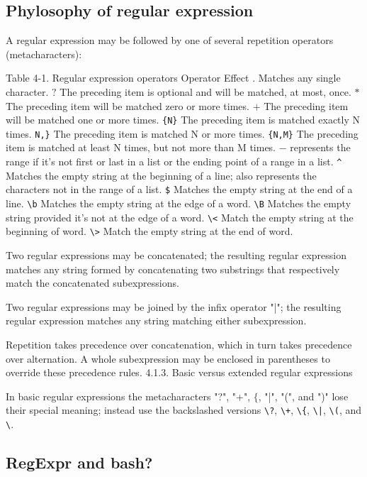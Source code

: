 \subsection{Phylosophy of regular expression}

A regular expression may be followed by one of several repetition operators (metacharacters):

Table 4-1. Regular expression operators
Operator	Effect
$.$	Matches any single character.
$?$	The preceding item is optional and will be matched, at most, once.
$*$	The preceding item will be matched zero or more times.
$+$	The preceding item will be matched one or more times.
\verb={N}=	The preceding item is matched exactly N times.
\verb=N,}=	The preceding item is matched N or more times.
\verb={N,M}=	The preceding item is matched at least N times, but not more than M times.
$-$	represents the range if it's not first or last in a list or the ending point of a range in a list.
\verb=^=	Matches the empty string at the beginning of a line; also represents the characters not in the range of a list.
\verb=$=	Matches the empty string at the end of a line.
\verb=\b=	Matches the empty string at the edge of a word.
\verb=\B=	Matches the empty string provided it's not at the edge of a word.
\verb=\<=	Match the empty string at the beginning of word.
\verb=\>=	Match the empty string at the end of word.

Two regular expressions may be concatenated; the resulting regular expression matches any string formed by concatenating two substrings that respectively match the concatenated subexpressions.

Two regular expressions may be joined by the infix operator "|"; the resulting regular expression matches any string matching either subexpression.

Repetition takes precedence over concatenation, which in turn takes precedence over alternation. A whole subexpression may be enclosed in parentheses to override these precedence rules.
4.1.3. Basic versus extended regular expressions

In basic regular expressions the metacharacters "?", "+", $\{$, "|", "(", and ")" lose their special meaning; instead use the backslashed versions \verb=\?=, \verb=\+=, \verb=\{=, \verb=\|=, \verb=\(=, and \verb=\=.

\subsection{RegExpr and bash?}
